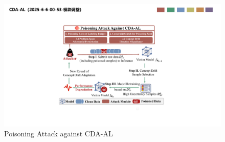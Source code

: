 %


\begin{figure}[t]
	\centering
	\includegraphics[width=\linewidth,keepaspectratio]{Graph/Attack_Method/PACDA_attack_process_2025_6_6_01_07.pdf}
	\caption{Poisoning Attack against CDA-AL}
	\label{fig:Attack Process}
\end{figure}

